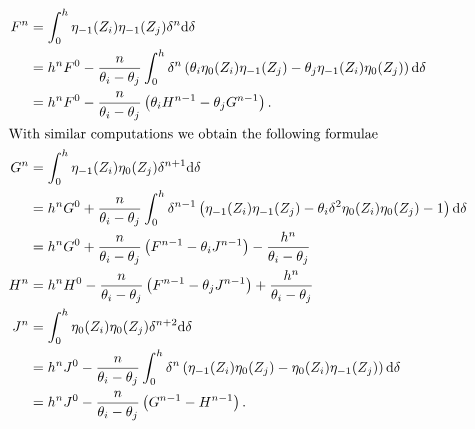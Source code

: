 \begin{align*}
  F^{n} & = \int_{0}^{h}\eta_{-1}(Z_i)\eta_{-1}(Z_j) \delta^{n} \dd \delta                                                                                    \\
        & =h^{n} F^0 - \frac{n}{\theta_i - \theta_j}\int_{0}^{h} \delta^{n} \left( \theta_i \eta_{0}(Z_i)\eta_{-1}(Z_j)
  - \theta_j \eta_{-1}(Z_i)\eta_{0}(Z_j) \right) \dd \delta                                                                                                   \\
        & =h^{n} F^0 - \frac{n}{\theta_i-\theta_j}\left(\theta_i H^{n-1} - \theta_j G^{n-1}\right)\text{.}                                                   \\
  \intertext{With similar computations we obtain the following formulae}
  G^{n} & = \int_{0}^{h}\eta_{-1}(Z_i)\eta_{0}(Z_j) \delta^{n+1} \dd \delta                                                                                   \\
        & = h^{n} G^0 + \frac{n}{\theta_i - \theta_j}\int_0^h \delta^{n-1} \left( \eta_{-1}(Z_i)\eta_{-1}(Z_j)
  - \theta_i\delta^2 \eta_{0}(Z_i)\eta_{0}(Z_j)  - 1 \right) \dd \delta                                                                                       \\
        & = h^{n} G^0 + \frac{n}{\theta_i - \theta_j}\left( F^{n-1} - \theta_i J^{n-1}\right) - \frac{h^{n}}{\theta_i - \theta_j}                             \\
  H^{n} & = h^{n} H^0 - \frac{n }{\theta_i - \theta_j}\left( F^{n-1} - \theta_j J^{n-1}\right) + \frac{h^{n}}{\theta_i - \theta_j}                            \\
  J^{n} & = \int_{0}^{h}\eta_{0}(Z_i)\eta_{0}(Z_j) \delta^{n+2} \dd \delta                                                                                    \\
        & = h^{n} J^0 - \frac{n }{\theta_i - \theta_j}\int_0^h \delta^{n} \left( \eta_{-1}(Z_i)\eta_{0}(Z_j) - \eta_{0}(Z_i)\eta_{-1}(Z_j) \right) \dd \delta \\
        & = h^{n} J^0 - \frac{n }{\theta_i - \theta_j}\left( G^{n-1} - H^{n-1} \right)\text{.}
\end{align*}

